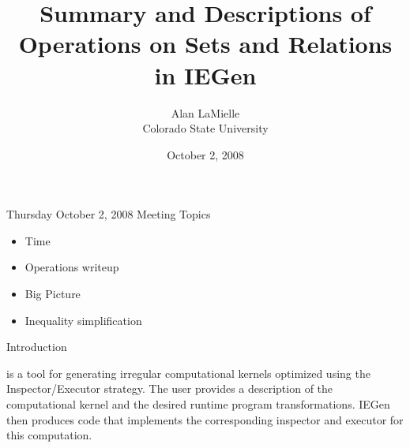 \documentclass[journal,10pt]{IEEEtran}
\title{Summary and Descriptions of Operations on Sets and Relations in IEGen}
\author{Alan LaMielle \\
	Colorado State University}
\date{October 2, 2008}
\begin{document}
\maketitle

\begin{section}{Thursday October 2, 2008 Meeting Topics}

\begin{itemize}
\item Time
\item Operations writeup
\item Big Picture
\item Inequality simplification
\end{itemize}

\end{section}

\begin{section}{Introduction}

 is a tool for generating irregular computational kernels optimized using the Inspector/Executor strategy.
The user provides a description of the computational kernel and the desired runtime program transformations.
IEGen then produces code that implements the corresponding inspector and executor for this computation.

\end{section}
\end{document}
